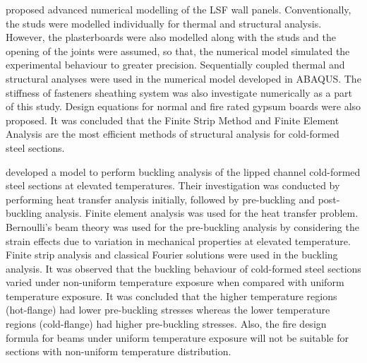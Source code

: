 \citet{BatistaAbreu2015} proposed advanced numerical modelling of the LSF wall panels. Conventionally, the studs were modelled individually for thermal and structural analysis. However, the plasterboards were also modelled along with the studs and the opening of the joints were assumed, so that, the numerical model simulated the experimental behaviour to greater precision. Sequentially coupled thermal and structural analyses were used in the numerical model developed in ABAQUS. The stiffness of fasteners sheathing system was also investigate numerically as a part of this study. Design equations for normal and fire rated gypsum boards were also proposed. It was concluded that the Finite Strip Method and Finite Element Analysis are the most efficient methods of structural analysis for cold-formed steel sections.  

\citet{Cheng2015} developed a model to perform buckling analysis of the lipped channel cold-formed steel sections at elevated temperatures. Their investigation was conducted by performing heat transfer analysis initially, followed by pre-buckling and post-buckling analysis. Finite element analysis was used for the heat transfer problem. Bernoulli’s beam theory was used for the pre-buckling analysis by considering the strain effects due to variation in mechanical properties at elevated temperature. Finite strip analysis and classical Fourier solutions were used in the buckling analysis. It was observed that the buckling behaviour of cold-formed steel sections varied under non-uniform temperature exposure when compared with uniform temperature exposure. It was concluded that the higher temperature regions (hot-flange) had lower pre-buckling stresses whereas the lower temperature regions (cold-flange) had higher pre-buckling stresses. Also, the fire design formula for beams under uniform temperature exposure will not be suitable for sections with non-uniform temperature distribution.

